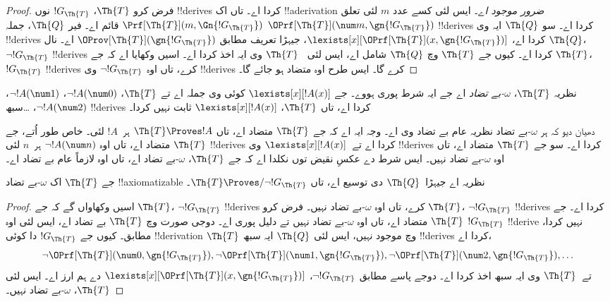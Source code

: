 \documentclass[../../../include/open-logic-section]{subfiles}
\begin{document}
\begin{proof}
فرض کرو $\Th{T}$، $!G_\Th{T}$ نوں !!{derive}s کردا اے۔
تاں اک !!a{derivation} \emph{ضرور موجود اے}۔ ایس لئی کسے عدد
$m$ لئی تعلق $\Prf[\Th{T}](m,
\Gn{!G_\Th{T}})$ قائم اے۔ فیر $\Th{Q}$، جملہ
$\OPrf[\Th{T}](\num m, \gn{!G_\Th{T}})$ !!{derive}s کردا اے۔
سو $\Th{Q}$ ایہ وی !!{derive}s کردا اے،
$\lexists[x][\OPrf[\Th{T}](x,\gn{!G_\Th{T}})]$، جیہڑا تعریف
مطابق $\OProv[\Th{T}](\gn{!G_\Th{T}})$ اے۔ 
نال $\Th{Q}$، $\lnot !G_\Th{T}$ !!{derive}s کردا اے۔
کیوں جے $\Th{T}$ وچ $\Th{Q}$ شامل اے، ایس لئی
~$\Th{T}$ وی ایہ اخذ کردا اے۔ اسیں وکھایا اے کہ جے
$\Th{T}$، $!G_\Th{T}$ !!{derive}s کرے، تاں اوہ
$\lnot !G_\Th{T}$ وی !!{derive}s کرے گا۔ ایس طرح اوہ متضاد
ہو جائے گا۔
\end{proof}

\begin{defn}
نظریہ $\Th{T}$، \emph{$\omega$-بے تضاد} اے جے ایہ شرط
پوری ہووے۔ جے $\lexists[x][!A(x)]$ کوئی وی جملہ اے تے
$\Th{T}$، $\lnot
!A(\num 0)$، $\lnot !A(\num 1)$، $\lnot !A(\num 2)$،
\dots سبھ !!{derive}s کردا اے، تاں $\Th{T}$،
$\lexists[x][!A(x)]$ ثابت نہیں کردا۔
\end{defn}

دھیان دیو کہ ہر $\omega$-بے تضاد نظریہ عام بے تضاد وی اے۔
وجہ ایہ اے کہ جے $\Th{T}$ متضاد اے، تاں $\Th{T} \Proves !A$
ہر~$!A$ لئی۔ خاص طور اُتے، جے $\Th{T}$ متضاد اے، تاں
اوہ $\lnot !A(\num n)$ ہر~$n$ لئی !!{derive}s کردا اے
تے~$\lexists[x][!A(x)]$ وی !!{derive}s کردا اے۔ سو جے
$\Th{T}$ متضاد اے، تاں اوہ $\omega$-بے تضاد نہیں۔ ایس
شرط دے عکسِ نقیض توں نکلدا اے کہ جے $\Th{T}$،
$\omega$-بے تضاد اے، تاں اوہ لازماً عام بے تضاد اے۔

\begin{lem}
جے $\Th{T}$ اک $\omega$-بے تضاد !!{axiomatizable} نظریہ اے
جیہڑا~$\Th{Q}$ دی توسیع اے، تاں
$\Th{T} \Proves/ \lnot !G_\Th{T}$۔
\end{lem}

\begin{proof}
اسیں وکھاواں گے کہ جے $\Th{T}$، $\lnot !G_\Th{T}$
!!{derive}s کرے، تاں اوہ $\omega$-بے تضاد نہیں۔ فرض کرو
$\Th{T}$، $\lnot !G_\Th{T}$ !!{derive}s کردا اے۔ جے
$\Th{T}$ متضاد اے، تاں اوہ $\omega$-بے تضاد نہیں تے
دلیل پوری اے۔ دوجی صورت وچ $\Th{T}$ بے تضاد اے، ایس لئی
اوہ $!G_\Th{T}$ !!{derive} نہیں کردا، 
مطابق۔ کیوں جے $!G_\Th{T}$ دا کوئی !!{derivation}
$\Th{T}$ وچ موجود نہیں، ایس لئی $\Th{Q}$ ایہ سبھ
!!{derive}s کردا اے،
\[
\lnot \OPrf[\Th{T}](\num 0, \gn{!G_\Th{T}}), \lnot \OPrf[\Th{T}](\num 1,
\gn{!G_\Th{T}}), \lnot \OPrf[\Th{T}](\num 2, \gn{!G_\Th{T}}), \dots
\]
تے~$\Th{T}$ وی ایہ سبھ اخذ کردا اے۔ دوجے پاسے
 مطابق $\lnot
!G_\Th{T}$، $\lexists[x][\OPrf[\Th{T}](x,\gn{!G_\Th{T}})]$
دے ہم ارز اے۔ ایس لئی $\Th{T}$، $\omega$-بے تضاد نہیں۔
\end{proof}
\end{document}
